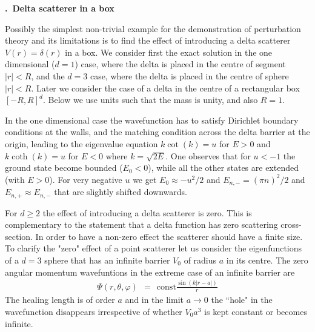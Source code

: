 \documentclass[onecolumn,fleqn, 11pt]{revtex4}
\newcommand{\const}{\mathrm{const}}
\newcommand{\beq}{\begin{eqnarray}}
\newcommand{\eeq}{\end{eqnarray}}
\renewcommand{\thesubsection}{\arabic{subsection}}
\renewcommand{\thesubsubsection}{\arabic{subsubsection}}
\newcommand{\sheadC}[1]
{
\addtocounter{subsubsection}{1}
\vspace{5mm}
{\bf \thesubsection.\thesubsubsection \ #1}  
\nopagebreak
\phantomsection
}
\begin{document}
\newpage
\sheadC{Delta scatterer in a box}

Possibly the simplest non-trivial example for the demonstration 
of perturbation theory and its limitations is to find the 
effect of introducing a delta scatterer $V(r)=\delta(r)$ in a box. 
We consider first the exact solution in the 
one dimensional ($d=1$) case, where the delta is placed in 
the centre of segment $|r|<R$, and the $d=3$ case, 
where the delta is placed in the centre of sphere $|r|<R$.
Later we consider the case of a delta in the centre 
of a rectangular box ${[-R,R]^d}$. Below we use units 
such that the mass is unity, and also ${R=1}$.     


In the one dimensional case the wavefunction 
has to satisfy Dirichlet boundary conditions 
at the walls, and the matching condition across 
the delta barrier at the origin, leading to 
the eigenvalue equation $k\cot(k)=u$ for $E>0$ 
and $k\coth(k)=u$ for $E<0$ where ${k=\sqrt{2E}}$. 
One observes that for ${u<-1}$ the ground state 
become bounded ($E_0<0$), while all the other  
states are extended (with ${E>0}$). For very 
negative $u$ we get $E_0 \approx -u^2/2$ 
and  $E_{n,-} = (\pi n)^2/2$ and $E_{n,+}\approx E_{n,-}$
that are slightly shifted downwards.   

For $d\ge2$ the effect of introducing a delta scatterer 
is zero. This is complementary to the statement that a delta 
function has zero scattering cross-section. 
In order to have a non-zero effect the scatterer 
should have a finite size. 
To clarify the "zero" effect of a point scatterer 
let us consider the eigenfunctions of a ${d=3}$ sphere 
that has an infinite barrier $V_0$ of radius $a$ in its centre.
The zero angular momentum wavefuntions in the extreme case 
of an infinite barrier are
\beq 
\Psi(r,\theta,\varphi) \ \ = \ \ \const \frac{\sin(k|r-a|)}{r}  
\eeq
The healing length is of order $a$ and in 
the limit $a\rightarrow0$ the ``hole" 
in the wavefunction disappears irrespective 
of whether $V_0a^3$ is kept constant or becomes infinite.
\end{document}
